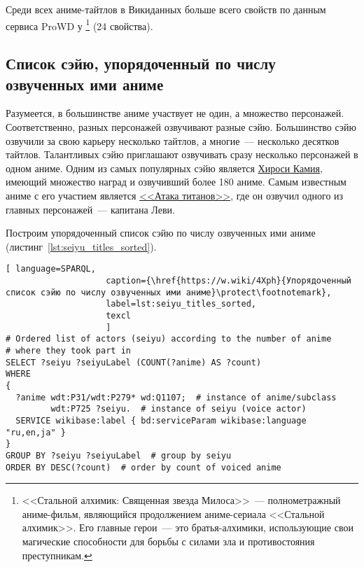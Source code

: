Среди всех аниме-тайтлов в Викиданных больше всего свойств по данным сервиса ProWD\autocite{anime_prowd} у \footnote{<<Стальной алхимик: Священная звезда Милоса>>~--- полнометражный аниме-фильм, являющийся продолжением аниме-сериала <<Стальной алхимик>>. Его главные герои~--- это братья-алхимики, использующие свои магические способности для борьбы с силами зла и противостояния преступникам.} (\num{24} свойства).

\subsection{Список сэйю, упорядоченный по числу озвученных ими аниме}

Разумеется, в большинстве аниме участвует не один, а множество персонажей. Соответственно, разных персонажей озвучивают разные сэйю. Большинство сэйю озвучили за свою карьеру несколько тайтлов, а многие~--- несколько десятков тайтлов. Талантливых сэйю приглашают озвучивать сразу несколько персонажей в одном аниме. Одним из самых популярных сэйю является \href{https://w.wiki/4L5q}{Хироси Камия}, имеющий множество наград и озвучивший более 180 аниме. Самым известным аниме с его участием является \href{https://w.wiki/4L5r}{<<Атака титанов>>}, где он озвучил одного из главных персонажей~--- капитана Леви.

Построим упорядоченный список сэйю по числу озвученных ими аниме (листинг~\ref{lst:seiyu_titles_sorted}).

\begin{lstlisting}[ language=SPARQL, 
                    caption={\href{https://w.wiki/4Xph}{Упорядоченный список сэйю по числу озвученных ими аниме}\protect\footnotemark},
                    label=lst:seiyu_titles_sorted,
                    texcl 
                    ]
# Ordered list of actors (seiyu) according to the number of anime
# where they took part in
SELECT ?seiyu ?seiyuLabel (COUNT(?anime) AS ?count)
WHERE
{
  ?anime wdt:P31/wdt:P279* wd:Q1107;  # instance of anime/subclass
         wdt:P725 ?seiyu.  # instance of seiyu (voice actor)
  SERVICE wikibase:label { bd:serviceParam wikibase:language "ru,en,ja" }
}
GROUP BY ?seiyu ?seiyuLabel  # group by seiyu 
ORDER BY DESC(?count)  # order by count of voiced anime
\end{lstlisting}%

